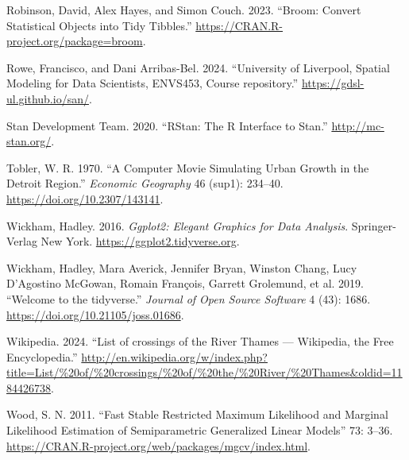 \begin{CSLReferences}{1}{0}
\leavevmode{}%
Robinson, David, Alex Hayes, and Simon Couch. 2023. {``Broom: Convert Statistical Objects into Tidy Tibbles.''} \url{https://CRAN.R-project.org/package=broom}.

\leavevmode{}%
Rowe, Francisco, and Dani Arribas-Bel. 2024. {``{University of Liverpool, Spatial Modeling for Data Scientists, ENVS453, Course repository}.''} \url{https://gdsl-ul.github.io/san/}.

\leavevmode{}%
Stan Development Team. 2020. {``{RStan}: The {R} Interface to {Stan}.''} \url{http://mc-stan.org/}.

\leavevmode{}%
Tobler, W. R. 1970. {``A Computer Movie Simulating Urban Growth in the Detroit Region.''} \emph{Economic Geography} 46 (sup1): 234--40. \url{https://doi.org/10.2307/143141}.

\leavevmode{}%
Wickham, Hadley. 2016. \emph{Ggplot2: Elegant Graphics for Data Analysis}. Springer-Verlag New York. \url{https://ggplot2.tidyverse.org}.

\leavevmode{}%
Wickham, Hadley, Mara Averick, Jennifer Bryan, Winston Chang, Lucy D'Agostino McGowan, Romain François, Garrett Grolemund, et al. 2019. {``Welcome to the {tidyverse}.''} \emph{Journal of Open Source Software} 4 (43): 1686. \url{https://doi.org/10.21105/joss.01686}.

\leavevmode{}%
Wikipedia. 2024. {``{List of crossings of the River Thames} --- {W}ikipedia{,} the Free Encyclopedia.''} \url{http://en.wikipedia.org/w/index.php?title=List/\%20of/\%20crossings/\%20of/\%20the/\%20River/\%20Thames\&oldid=1184426738}.

\leavevmode{}%
Wood, S. N. 2011. {``Fast Stable Restricted Maximum Likelihood and Marginal Likelihood Estimation of Semiparametric Generalized Linear Models''} 73: 3--36. \url{https://CRAN.R-project.org/web/packages/mgcv/index.html}.

\end{CSLReferences}



\address{%
Kevin Horan\\
Hamilton Institute, Maynooth University\\%
Maynooth\\ Co.~Kildare, Ireland\\
%
\url{https://github.com/horankev}\\%
\textit{ORCiD: \href{https://orcid.org/0009-0003-9378-0084}{0009-0003-9378-0084}}\\%
\href{mailto:kevin.horan.2021@mumail.ie}{\nolinkurl{kevin.horan.2021@mumail.ie}}%
}

